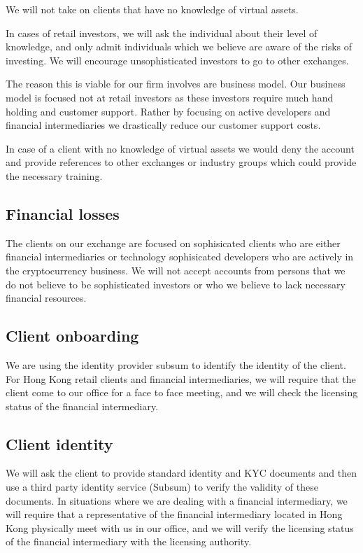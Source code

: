 We will not take on clients that have no knowledge of virtual assets.

In cases of retail investors, we will ask the individual about their
level of knowledge, and only admit individuals which we believe are
aware of the risks of investing.  We will encourage unsophisticated
investors to go to other exchanges.

The reason this is viable for our firm involves are business model.
Our business model is focused not at retail investors as these
investors require much hand holding and customer support.  Rather by
focusing on active developers and financial intermediaries we
drastically reduce our customer support costs.

In case of a client with no knowledge of virtual assets we would deny
the account and provide references to other exchanges or industry
groups which could provide the necessary training.

\subsection{Financial losses}

The clients on our exchange are focused on sophisicated clients who
are either financial intermediaries or technology sophisicated
developers who are actively in the cryptocurrency business.  We will
not accept accounts from persons that we do not believe to be
sophisticated investors or who we believe to lack necessary financial
resources.

\subsection{Client onboarding}

We are using the identity provider subsum to identify the identity of
the client.  For Hong Kong retail clients and financial
intermediaries, we will require that the client come to our office for
a face to face meeting, and we will check the licensing status of the
financial intermediary.

\subsection{Client identity}
We will ask the client to provide standard identity and KYC documents
and then use a third party identity service (Subsum) to verify the
validity of these documents.  In situations where we are dealing with
a financial intermediary, we will require that a representative of the
financial intermediary located in Hong Kong physically meet with us in
our office, and we will verify the licensing status of the financial
intermediary with the licensing authority.

